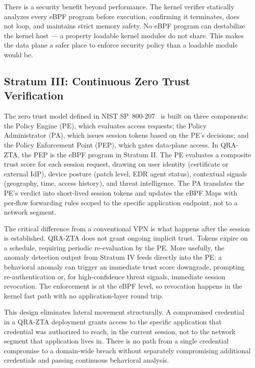 \documentclass[conference]{IEEEtran}
\begin{document}
There is a security benefit beyond performance. The kernel
verifier statically analyzes every eBPF program before
execution, confirming it terminates, does not loop, and
maintains strict memory safety. No eBPF program can destabilize
the kernel host --- a property loadable kernel modules do not
share. This makes the data plane a safer place to enforce
security policy than a loadable module would be.

\subsection{Stratum III: Continuous Zero Trust Verification}

The zero trust model defined in NIST SP~800-207~\cite{nist800207}
is built on three components: the Policy Engine (PE), which
evaluates access requests; the Policy Administrator (PA), which
issues session tokens based on the PE's decisions; and the
Policy Enforcement Point (PEP), which gates data-plane access.
In QRA-ZTA, the PEP is the eBPF program in Stratum II. The PE
evaluates a composite trust score for each session request,
drawing on user identity (certificate or external IdP), device
posture (patch level, EDR agent status), contextual signals
(geography, time, access history), and threat intelligence.
The PA translates the PE's verdict into short-lived session
tokens and updates the eBPF Maps with per-flow forwarding
rules scoped to the specific application endpoint, not to a
network segment.

The critical difference from a conventional VPN is what happens
after the session is established. QRA-ZTA does not grant
ongoing implicit trust. Tokens expire on a schedule, requiring
periodic re-evaluation by the PE. More usefully, the anomaly
detection output from Stratum IV feeds directly into the PE:
a behavioral anomaly can trigger an immediate trust score
downgrade, prompting re-authentication or, for high-confidence
threat signals, immediate session revocation. The enforcement
is at the eBPF level, so revocation happens in the kernel fast
path with no application-layer round trip.

This design eliminates lateral movement structurally. A
compromised credential in a QRA-ZTA deployment grants access
to the specific application that credential was authorized
to reach, in the current session, not to the network segment
that application lives in. There is no path from a single
credential compromise to a domain-wide breach without
separately compromising additional credentials and passing
continuous behavioral analysis.
\end{document}
